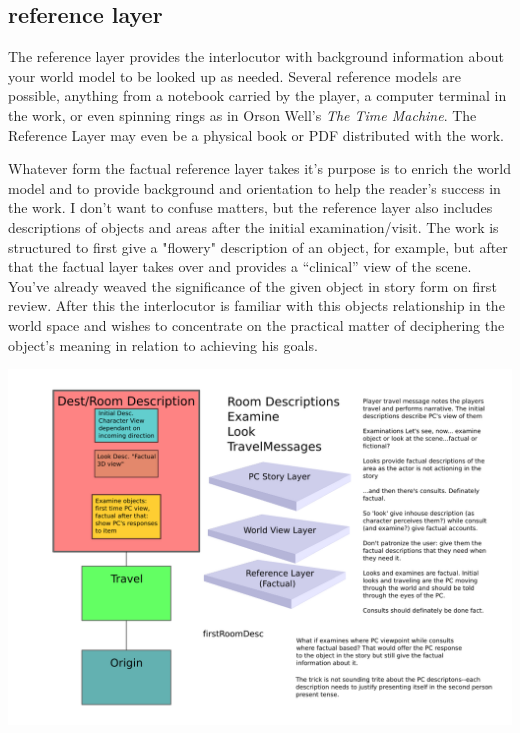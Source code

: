\subsection{reference layer}
The reference layer provides the interlocutor with background information about
your world model to be looked up as needed. Several reference models are possible, anything from a notebook carried by the player, a computer terminal in the work, or even spinning rings as in Orson Well's \textit{The Time Machine}. The Reference Layer may even be a physical book or PDF distributed with the work.

Whatever form the factual reference layer takes it's purpose is to enrich the world model and to provide background and orientation to help the reader's success in the work.
I don't want to confuse matters, but the reference layer also includes
descriptions of objects and areas after the initial examination/visit. The work
is structured to first give a "flowery" description of an object, for example,
but after that the factual layer takes over and provides a ``clinical'' view of
the scene. You've already weaved the significance of the given object in story form on first review. After this the interlocutor is familiar with this objects relationship in the world space and wishes to concentrate on the practical matter of deciphering the object's meaning in relation to achieving his goals.

\begin{centering}
\includegraphics[width=\textwidth]{./media/images/room_examine.png}
\end{centering}

